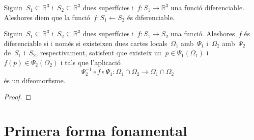 \documentclass[../../main.tex]{subfiles}
\begin{document}
	\begin{definition}
		\label{def:funció diferenciable entre superfícies}
		Siguin~\(S_{1}\subseteq\mathbb{R}^{3}\) i~\(S_{2}\subseteq\mathbb{R}^{3}\) dues superfícies i~\(f\colon S_{1}\longrightarrow\mathbb{R}^{3}\) una funció diferenciable.
		Aleshores diem que la funció~\(f\colon S_{1}\longleftarrow S_{2}\) és diferenciable.
	\end{definition}
	\begin{proposition}
		Siguin~\(S_{1}\subseteq\mathbb{R}^{3}\) i~\(S_{2}\subseteq\mathbb{R}^{3}\) dues superfícies i~\(f\colon S_{1}\longrightarrow S_{2}\) una funció.
		Aleshores~\(f\) és diferenciable si i només si existeixen dues cartes locals~\(\Omega_{1}\) amb~\(\Psi_{1}\) i~\(\Omega_{2}\) amb~\(\Psi_{2}\) de~\(S_{1}\) i~\(S_{2}\), respectivament, satisfent que existeix un~\(p\in\Psi_{1}(\Omega_{1})\) i~\(f(p)\in\Psi_{2}(\Omega_{2})\) i tals que l'aplicació
		\[
		    \Psi_{2}^{-1}\circ f\circ \Psi_{1}\colon\Omega_{1}\cap\Omega_{2}\longrightarrow\Omega_{1}\cap\Omega_{2}
		\]
		és un difeomorfisme.
		\begin{proof}
		\end{proof}
	\end{proposition}
	\section{Primera forma fonamental}
\end{document}

